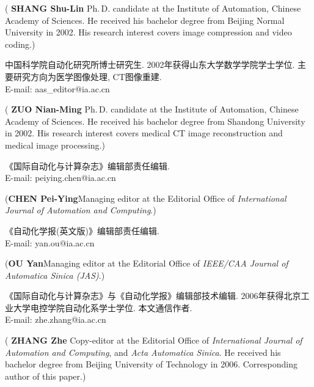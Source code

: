 \documentclass{aas}
\begin{document}
\begin{multicols}{2}
\begin{biography}
\noindent({\bf
SHANG Shu-Lin
}\quad
Ph.\,D. candidate at the
Institute of Automation, Chinese Academy of Sciences. He received
his bachelor degree from Beijing Normal University in 2002. His research
interest covers image compression and video coding.)
\end{biography}

\begin{biography}
\quad
中国科学院自动化研究所博士研究生.
2002年获得山东大学数学学院学士学位.
主要研究方向为医学图像处理, CT图像重建.\\E-mail: aas\_editor@ia.ac.cn

\noindent({\bf
ZUO Nian-Ming
}\quad
Ph.\,D. candidate at the
Institute of Automation, Chinese Academy of Sciences. He received
his bachelor degree from Shandong University in 2002. His research
interest covers medical CT image reconstruction and medical image
processing.)
\end{biography}

\begin{biographynophoto}
\quad 《国际自动化与计算杂志》编辑部责任编辑.\\E-mail: peiying.chen@ia.ac.cn

\noindent({\bf CHEN Pei-Ying}\quad Managing editor at the Editorial Office of
{\sl International Journal of Automation and Computing}.)
\end{biographynophoto}

\begin{biographynophoto}
\quad 《自动化学报(英文版)》编辑部责任编辑.\\E-mail: yan.ou@ia.ac.cn

\noindent({\bf OU Yan}\quad Managing editor at the Editorial Office of
{\sl IEEE/CAA Journal of Automatica Sinica (JAS)}.)
\end{biographynophoto}

\begin{biography}
\quad
《国际自动化与计算杂志》与《自动化学报》编辑部技术编辑. 2006年获得北京工业大学电控学院自动化系学士学位.
本文通信作者.\\E-mail: zhe.zhang@ia.ac.cn

\noindent({\bf
ZHANG Zhe
}\quad
Copy-editor at the Editorial Office of
{\sl International Journal of Automation and Computing}, and {\sl
Acta Automatica Sinica}. He received his bachelor degree from Beijing
University of Technology in 2006. Corresponding author of this paper.)
\end{biography}
\end{multicols}
\end{document}
